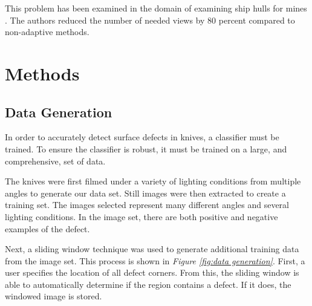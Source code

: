 \documentclass[letterpaper, 10 pt, conference]{ieeeconf}  %
\begin{document}
This problem has been examined in the domain of examining ship hulls for mines \cite{hollinger2011active}. The authors reduced the number of needed views by 80 percent compared to non-adaptive methods.

\section{Methods}

\subsection{Data Generation}

In order to accurately detect surface defects in knives, a classifier must be trained. To ensure the classifier is robust, it must be trained on a large, and comprehensive, set of data.

The knives were first filmed under a variety of lighting conditions from multiple angles to generate our data set. Still images were then extracted to create a training set. The images selected represent many different angles and several lighting conditions. In the image set, there are both positive and negative examples of the defect.

Next, a sliding window technique was used to generate additional training data from the image set. This process is shown in \textit{Figure \ref{fig:data generation}}. First, a user specifies the location of all defect corners. From this, the sliding window is able to automatically determine if the region contains a defect. If it does, the windowed image is stored.
\end{document}
